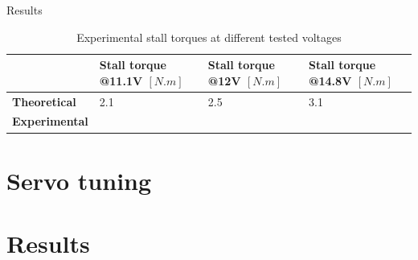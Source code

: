 Results
\begin{table}[htp]
\center
\begin{tabularx}{\textwidth}{@{}l X X X @{}}
\toprule
& \textbf{Stall torque @11.1V $[N.m]$} & \textbf{Stall torque @12V $[N.m]$} & \textbf{Stall torque @14.8V $[N.m]$}\\ 
\midrule
\textbf{Theoretical} & 2.1 & 2.5 & 3.1\\ 
\textbf{Experimental} &  &  & \\ 
\bottomrule
\end{tabularx}
\caption{Experimental stall torques at different tested voltages}
\label{table:exp1_results}
\end{table}

\section{Servo tuning}

\section{Results}